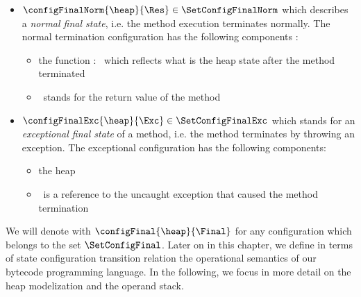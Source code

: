 \begin{itemize}
        \item  $\configFinalNorm{\heap}{\Res} \in \SetConfigFinalNorm $ which describes a \textit{normal final state}, i.e.
	       the method execution terminates normally. The normal termination configuration has the following components :
               \begin{itemize}
                      \item the function \heap : \HeapSet \ which reflects what is the heap state after the method terminated
		      
		      \item \Res \ stands for the return value  of the method
	       \end{itemize}

	\item  $\configFinalExc{\heap}{\Exc} \in \SetConfigFinalExc $ which stands for an 
               \textit{exceptional final state} of a method,
	       i.e. the method terminates by throwing an exception. The exceptional configuration has the following components:
               \begin{itemize}
                      \item the heap \heap 
		      \item \Exc \ is a reference to the uncaught exception that caused the method termination
               \end{itemize}

 \end{itemize}
  
 We will denote with $\configFinal{\heap}{\Final}$ for any configuration which belongs to the set  $\SetConfigFinal$. 
 Later on in this chapter, we define in terms of state configuration transition relation the operational semantics of
 our bytecode programming language.
 In the following, we focus in more detail on the heap modelization and the operand stack. 

